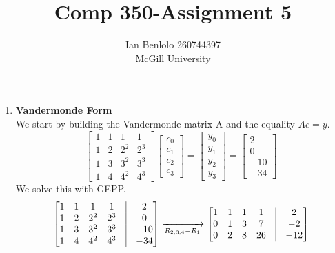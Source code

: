 
\usepackage{cancel}
\usepackage{verbatim}
\usepackage{enumerate}
\usepackage{pdfpages}
\usepackage{graphicx}
\usepackage{amsmath}
\usepackage{appendix}
\title{Comp 350-Assignment 5}
\author{Ian Benlolo 260744397\\McGill University\\}

\maketitle

\begin{enumerate}[1.]
\item
\textbf{Vandermonde Form}\\
We start by building the Vandermonde matrix A and the equality $Ac=y$.
$$
\begin{bmatrix}
1 & 1 & 1 & 1 \\
1 & 2 & 2^2 & 2^3\\
1 & 3 & 3^2 & 3^3\\
1 & 4 & 4^2 & 4^3
\end{bmatrix}
\begin{bmatrix}
c_0 \\c_1\\ c_2\\ c_3
\end{bmatrix}
=
\begin{bmatrix}
y_0 \\ y_1 \\y_2 \\y_3
\end{bmatrix}
=
\begin{bmatrix}
2\\0\\-10\\-34
\end{bmatrix}
$$
We solve this with GEPP.\\
$$
\begin{bmatrix}
1 & 1 & 1 & 1 & \vline & 2 \\
1 & 2 & 2^2 & 2^3 & \vline & 0\\
1 & 3 & 3^2 & 3^3 & \vline & -10\\
1 & 4 & 4^2 & 4^3 & \vline & -34
\end{bmatrix}
\xrightarrow[R_{2,3,4}-R_1]{ }
\begin{bmatrix}
1 & 1 & 1 & 1 & \vline&  2\\
0 & 1 & 3 & 7& \vline & -2\\
0 & 2 & 8 & 26& \vline & -12\\

\end{bmatrix}$$
\end{enumerate}
